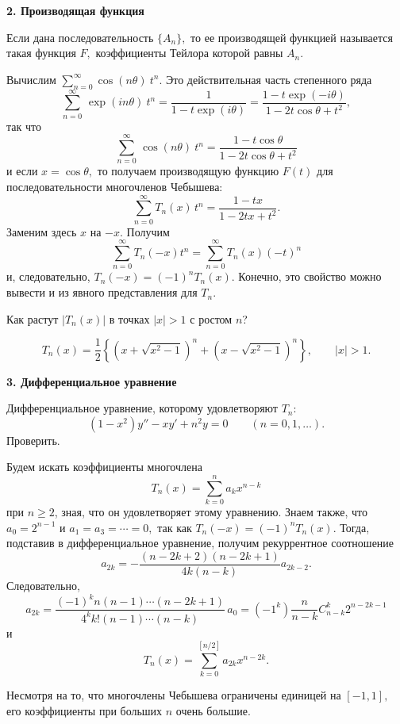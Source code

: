{\bf 2. Производящая функция}
\vspace{3mm}

Если дана последовательность $\{A_n\},$ то {ее} производящей функцией называется
такая функция $F,$ коэффициенты Тейлора которой равны $A_n.$

Вычислим {$\sum\limits_{n = 0}^{\infty} \cos (n\theta )\ {t^n}.$}
Это действительная часть степенного ряда
\[
  \sum\limits_{{n=0}}^{\infty}\, \exp{(i n\theta)}\ t^n=\frac{1}{1-t\exp{(i \theta)}}
 { =\frac{1-t\exp(-i\theta)}{1-2{t}\cos{\theta}+t^2},}
\]
так что
\[
  \sum\limits_{{n=0}}^{\infty}\, \cos (n\theta )\ {t^n}=
                      \frac{1-t \cos \theta}{1-2t\cos \theta +t^2}
\]
и если $x=\cos \theta,$ то получаем производящую функцию {$F(t)$} для {последовательности}
многочленов Чебышева:
\[
  \sum\limits_{n=0}^{\infty} T_n(x)\,t^n=\frac{1-tx}{1-2tx+t^2}.
\]
{Заменим здесь $x$ на $-x$. Получим}
$$
{\sum\limits_{n=0}^\infty{T_n(-x)t^n} = \sum\limits_{n=0}^\infty{T_n(x)(-t)^n}}
$$
{и, следовательно, $T_n(-x)=(-1)^nT_n(x)$. Конечно, это
свойство можно вывести и из} {явного представления для
$T_n$.}

\ex Как растут {$|T_n(x)|$} в точках $|x|>1$ {с ростом $n$?}

$$
{T_n(x)=\frac{1}{2}\left \{(x +\sqrt{x^2-1})^n+(x -
\sqrt{x^2-1})^n \right\}, \qquad |x|>1.}
$$

\vspace{3mm}
{\bf 3. Дифференциальное уравнение}
\vspace{3mm}

Дифференциальное уравнение, которому удовлетворяют $T_n$:
\[
  (1-x^2)y''-xy'+n^2y=0\qquad (n=0,1,\dots ).
\]
\ex Проверить.

Будем искать {коэффициенты многочлена}
$$
{ T_n(x)=\sum\limits_{k=0}^n a_kx^{n-k}}
$$
{при $n\ge 2$, зная, что он} удовлетворяет этому уравнению. {Знаем также, что}
$a_0=2^{n-1}$ {и} $a_1=a_3=\cdots =0,$ {так как $T_n(-x)=(-1)^nT_n(x).$} Тогда,
подставив в дифференциальное уравнение, получим рекуррентное соотношение
\[
  a_{2k}=-\frac{(n-2k+2)(n-2k+1)}{4k(n-k)}a_{2k-2}.
\]
Следовательно,
\[
  a_{2k}=\frac{(-1)^k n(n-1)\cdots (n-2k+1)}{4^kk!(n-1)\cdots (n-k)}\,{a_0}=
  (-1^k)
  \frac{n}{n-k}C^k_{n-k}2^{n-2k-1}
\]
{и}
$$
  T_n(x)=\sum\limits_{k=0}^{[n/2]} a_{2k}x^{n-2k}.
$$

\begin{Remark}
Несмотря на то, что многочлены Чебышева ограничены единицей на $[-1,1],$ его
коэффициенты при больших $n$ очень большие.
\end{Remark}

